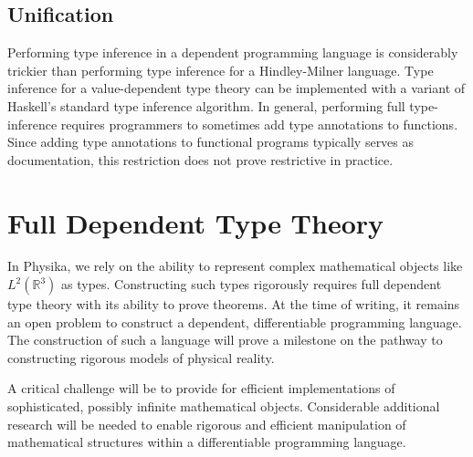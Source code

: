 \documentclass[book.tex]{subfiles}
\begin{document}
\subsection{Unification}

Performing type inference in a dependent programming language is considerably trickier than performing type inference for a Hindley-Milner language. Type inference for a value-dependent type theory can be implemented with a variant of Haskell's standard type inference algorithm. In general, performing full type-inference requires programmers to sometimes add type annotations to functions. Since adding type annotations to functional programs typically serves as documentation, this restriction does not prove restrictive in practice.

\section{Full Dependent Type Theory}

In Physika, we rely on the ability to represent complex mathematical objects like $L^2(\mathbb{R}^3)$ as types. Constructing such types rigorously requires full dependent type theory with its ability to prove theorems. At the time of writing, it remains an open problem to construct a dependent, differentiable programming language. The construction of such a language will prove a milestone on the pathway to constructing rigorous models of physical reality.

A critical challenge will be to provide for efficient implementations of sophisticated, possibly infinite mathematical objects. Considerable additional research will be needed to enable rigorous and efficient manipulation of mathematical structures within a differentiable programming language.
\end{document}
